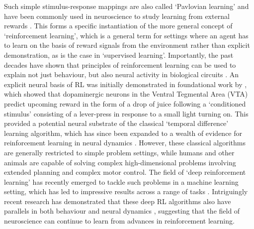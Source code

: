 Such simple stimulus-response mappings are also called `Pavlovian learning' and have been commonly used in neuroscience to study learning from external rewards \citep{niv2009reinforcement}.
This forms a specific instantiation of the more general concept of `reinforcement learning', which is a general term for settings where an agent has to learn on the basis of reward signals from the environment rather than explicit demonstration, as is the case in `supervised learning'.
Importantly, the past decades have shown that principles of reinforcement learning can be used to explain not just behaviour, but also neural activity in biological circuits \citep{niv2009reinforcement}.
An explicit neural basis of RL was initially demonstrated in foundational work by \citet{schultz1997neural}, which showed that dopaminergic neurons in the Ventral Tegmental Area (VTA) predict upcoming reward in the form of a drop of juice following a `conditioned stimulus' consisting of a lever-press in response to a small light turning on.
This provided a potential neural substrate of the classical `temporal difference' learning algorithm, which has since been expanded to a wealth of evidence for reinforcement learning in neural dynamics \citep{niv2009reinforcement, dabney2020distributional}.
However, these classical algorithms are generally restricted to simple problem settings, while humans and other animals are capable of solving complex high-dimensional problems involving extended planning and complex motor control.
The field of `deep reinforcement learning' has recently emerged to tackle such problems in a machine learning setting, which has led to impressive results across a range of tasks \citep{mnih2013playing, schrittwieser2020mastering, wurman2022outracing}.
Intriguingly recent research has demonstrated that these deep RL algorithms also have parallels in both behaviour and neural dynamics \citep{botvinick2020deep, wang2018prefrontal, dabney2020distributional, jensen2023recurrent, vinyals2019grandmaster}, suggesting that the field of neuroscience can continue to learn from advances in reinforcement learning.

